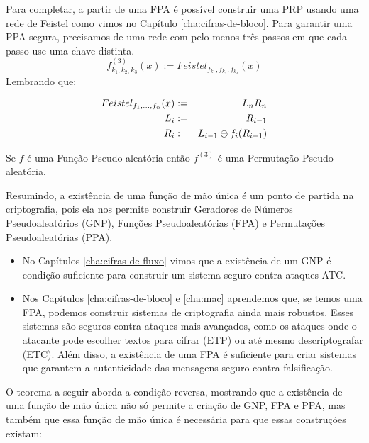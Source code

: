 Para completar, a partir de uma FPA é possível construir uma PRP usando uma rede de Feistel como vimos no Capítulo \ref{cha:cifras-de-bloco}.
Para garantir uma PPA segura, precisamos de uma rede com pelo menos três passos em que cada passo use uma chave distinta.
\begin{displaymath}
  f_{k_1,k_2,k_3}^{(3)}(x) := Feistel_{f_{k_1},f_{k_2},f_{k_3}}(x)
\end{displaymath}
Lembrando que:

\begin{eqnarray*}
  Feistel_{f_1,\dots,f_n}(x) & := & L_nR_n\\
  L_i & := & R_{i-1}\\
  R_i & := & L_{i-1} \oplus f_i(R_{i-1})
\end{eqnarray*}


\begin{theorem}
  Se $f$ é uma Função Pseudo-aleatória então $f^{(3)}$ é uma Permutação Pseudo-aleatória.
\end{theorem}

Resumindo, a existência de uma função de mão única é um ponto de partida na criptografia, pois ela nos permite construir Geradores de Números Pseudoaleatórios (GNP), Funções Pseudoaleatórias (FPA) e Permutações Pseudoaleatórias (PPA).
\begin{itemize}
\item No Capítulos \ref{cha:cifras-de-fluxo} vimos que a existência de um GNP é condição suficiente para construir um sistema seguro contra ataques ATC.
\item Nos Capítulos \ref{cha:cifras-de-bloco} e \ref{cha:mac} aprendemos que, se temos uma FPA, podemos construir sistemas de criptografia ainda mais robustos. Esses sistemas são seguros contra ataques mais avançados, como os ataques onde o atacante pode escolher textos para cifrar (ETP) ou até mesmo descriptografar (ETC).
  Além disso, a existência de uma FPA é suficiente para criar sistemas que garantem a autenticidade das mensagens seguro contra falsificação.
\end{itemize}

O teorema a seguir aborda a condição reversa, mostrando que a existência de uma função de mão única não só permite a criação de GNP, FPA e PPA, mas também que essa função de mão única é necessária para que essas construções existam:

